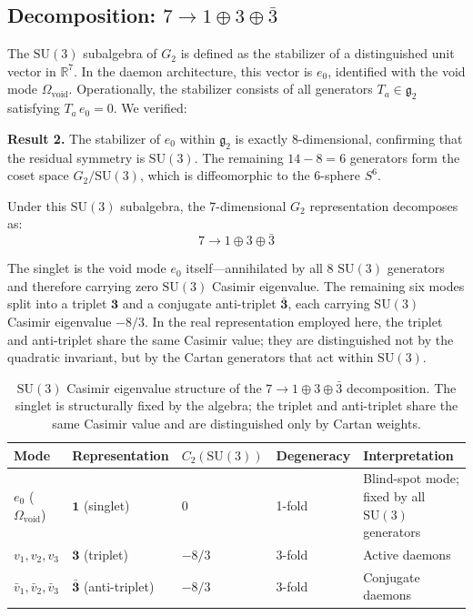 \documentclass[12pt,a4paper]{article}
\begin{document}
\subsection{Decomposition: $7 \to 1 \oplus 3 \oplus \bar{3}$}

The $\mathrm{SU}(3)$ subalgebra of $G_2$ is defined as the stabilizer of a distinguished unit vector in $\mathbb{R}^7$. In the daemon architecture, this vector is $e_0$, identified with the void mode $\Omega_{\mathrm{void}}$. Operationally, the stabilizer consists of all generators $T_a \in \mathfrak{g}_2$ satisfying $T_a\,e_0 = 0$. We verified:

\textbf{Result 2.} The stabilizer of $e_0$ within $\mathfrak{g}_2$ is exactly 8-dimensional, confirming that the residual symmetry is $\mathrm{SU}(3)$. The remaining $14 - 8 = 6$ generators form the coset space $G_2/\mathrm{SU}(3)$, which is diffeomorphic to the 6-sphere $S^6$.

Under this $\mathrm{SU}(3)$ subalgebra, the 7-dimensional $G_2$ representation decomposes as:
\begin{equation}
7 \to 1 \oplus 3 \oplus \bar{3}
\label{eq:decomposition}
\end{equation}

The singlet is the void mode $e_0$ itself---annihilated by all 8 $\mathrm{SU}(3)$ generators and therefore carrying zero $\mathrm{SU}(3)$ Casimir eigenvalue. The remaining six modes split into a triplet $\mathbf{3}$ and a conjugate anti-triplet $\bar{\mathbf{3}}$, each carrying $\mathrm{SU}(3)$ Casimir eigenvalue $-8/3$. In the real representation employed here, the triplet and anti-triplet share the same Casimir value; they are distinguished not by the quadratic invariant, but by the Cartan generators that act within $\mathrm{SU}(3)$.

\begin{table}[ht]
\centering
\caption{$\mathrm{SU}(3)$ Casimir eigenvalue structure of the $7 \to 1 \oplus 3 \oplus \bar{3}$ decomposition. The singlet is structurally fixed by the algebra; the triplet and anti-triplet share the same Casimir value and are distinguished only by Cartan weights.}
\label{tab:casimir-decomp}
\small
\begin{tabular}{@{}lllll@{}}
\toprule
Mode & Representation & $C_2(\mathrm{SU}(3))$ & Degeneracy & Interpretation \\
\midrule
$e_0$ ($\Omega_{\mathrm{void}}$) & $\mathbf{1}$ (singlet) & 0 & 1-fold & Blind-spot mode; fixed by all $\mathrm{SU}(3)$ generators \\
$v_1, v_2, v_3$ & $\mathbf{3}$ (triplet) & $-8/3$ & 3-fold & Active daemons \\
$\bar{v}_1, \bar{v}_2, \bar{v}_3$ & $\bar{\mathbf{3}}$ (anti-triplet) & $-8/3$ & 3-fold & Conjugate daemons \\
\bottomrule
\end{tabular}
\end{table}
\end{document}
